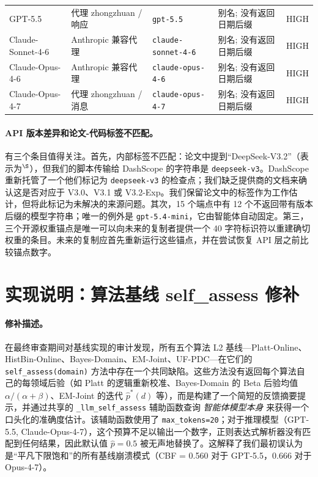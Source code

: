 \documentclass[11pt,a4paper,fontset=fandol]{ctexart}
\begin{document}
\begin{table}[h]
\begin{tabular}{@{}llllc@{}}
GPT-5.5             & 代理 zhongzhuan / 响应           & \texttt{gpt-5.5}                             & 别名; 没有返回日期后缀    & HIGH \\
Claude-Sonnet-4-6   & Anthropic 兼容代理               & \texttt{claude-sonnet-4-6}                   & 别名; 没有返回日期后缀    & HIGH \\
Claude-Opus-4-6     & Anthropic 兼容代理               & \texttt{claude-opus-4-6}                     & 别名; 没有返回日期后缀    & HIGH \\
Claude-Opus-4-7     & 代理 zhongzhuan / 消息            & \texttt{claude-opus-4-7}                     & 别名; 没有返回日期后缀    & HIGH \\
\bottomrule
\end{tabular}
\end{table}

\paragraph{API 版本差异和论文-代码标签不匹配。} 有三个条目值得关注。首先，内部标签不匹配：论文中提到“DeepSeek-V3.2”（表示为$^\S$），但我们的脚本传输给 DashScope 的字符串是 \texttt{deepseek-v3}。DashScope 重新托管了一个他们标记为 \texttt{deepseek-v3} 的检查点；我们缺乏提供商的文档来确认这是否对应于 V3.0、V3.1 或 V3.2-Exp。我们保留论文中的标签作为工作估计，但将此标记为未解决的来源问题。其次，15 个端点中有 12 个不返回带有版本后缀的模型字符串；唯一的例外是 \texttt{gpt-5.4-mini}，它由智能体自动固定。第三，三个开源权重锚点是唯一可以向未来的复制者提供一个 40 字符标识符以重建确切权重的条目。未来的复制应首先重新运行这些锚点，并在尝试恢复 API 层之前比较锚点数字。

\section{实现说明：算法基线 self\_assess 修补}
\label{sec:bugfix}

\paragraph{修补描述。} 在最终审查期间对基线实现的审计发现，所有五个算法 L2 基线---Platt-Online、HistBin-Online、Bayes-Domain、EM-Joint、UF-PDC---在它们的 \texttt{self\_assess(domain)} 方法中存在一个共同缺陷。这些方法没有返回每个算法自己的每领域后验（如 Platt 的逻辑重新校准、Bayes-Domain 的 Beta 后验均值 $\alpha/(\alpha+\beta)$、EM-Joint 的迭代 $\hat p^*(d)$ 等），而是构建了一个简短的反馈摘要提示，并通过共享的 \texttt{\_llm\_self\_assess} 辅助函数查询 \emph{智能体模型本身} 来获得一个口头化的准确度估计。该辅助函数使用了 \texttt{max\_tokens=20}；对于推理模型（GPT-5.5, Claude-Opus-4-7），这个预算不足以输出一个数字，正则表达式解析器没有匹配到任何结果，因此默认值 $\hat p=0.5$ 被无声地替换了。这解释了我们最初误认为是“平凡下限饱和”的所有基线崩溃模式（CBF = 0.560 对于 GPT-5.5，0.666 对于 Opus-4-7）。
\end{document}

